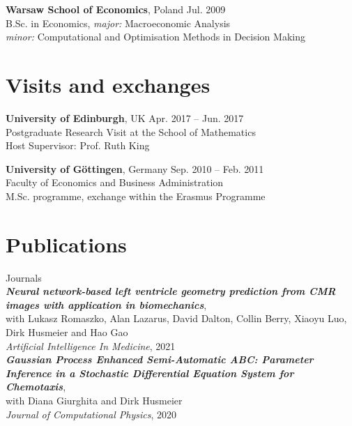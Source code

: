 \documentclass[margin,line]{resume}
\begin{document}
\begin{resume}
 	\textbf{Warsaw School of Economics}, Poland  \hfill  Jul. 2009\\
   	B.Sc. in Economics, \textit{major:} Macroeconomic Analysis\\ 
    \textit{minor:} Computational and Optimisation Methods in Decision Making\\

\vspace{-5mm}
    
\section{\mysidestyle Visits and exchanges}
    \textbf{University of Edinburgh},  UK \hfill Apr. 2017 -- Jun. 2017\\
	Postgraduate Research Visit at the School of Mathematics\\ 
    Host Supervisor: Prof. Ruth King
  
    \vspace{-1mm}

	\textbf{University of G{\"o}ttingen}, Germany   \hfill Sep. 2010 -- Feb. 2011	\\
    Faculty of Economics and Business Administration \\M.Sc. programme, exchange within the Erasmus Programme
        

\vspace{-2mm}    
\section{\mysidestyle Publications}
{\mysidestyle Journals\vspace{1mm}}\\
\textit{\textbf{Neural network-based left ventricle geometry prediction from CMR images with application in biomechanics}},\\
	with Lukasz Romaszko, Alan Lazarus, David Dalton, Collin Berry, Xiaoyu Luo, Dirk Husmeier and Hao Gao\\
    \textit{Artificial Intelligence In Medicine}, 2021
\vspace{2 mm}\\
\textit{\textbf{Gaussian Process Enhanced Semi-Automatic ABC: Parameter Inference in a Stochastic Differential Equation System for Chemotaxis}},\\ 
    with Diana Giurghita and Dirk Husmeier\\
    \textit{Journal of Computational Physics}, 2020

\pagebreak


\end{resume}
\end{document}
